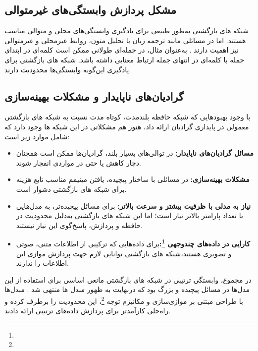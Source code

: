 \subsection{مشکل پردازش وابستگی‌های غیرمتوالی}
شبکه های بازگشتی به‌طور طبیعی برای یادگیری وابستگی‌های محلی و متوالی مناسب هستند. اما در مسائلی مانند ترجمه زبان یا تحلیل متون، روابط غیرمحلی و غیرمتوالی نیز اهمیت دارند
\cite{bahdanau2014neural}.
به‌عنوان مثال، در جمله‌ای طولانی ممکن است کلمه‌ای در ابتدای جمله با کلمه‌ای در انتهای جمله ارتباط معنایی داشته باشد. شبکه های بازگشتی برای یادگیری این‌گونه وابستگی‌ها محدودیت دارند.

\subsection{گرادیان‌های ناپایدار و مشکلات بهینه‌سازی}
با وجود بهبودهایی که شبکه حافظه بلندمدت، کوتاه مدت نسبت به شبکه های بازگشتی معمولی در پایداری گرادیان ارائه داد، هنوز هم مشکلاتی در این شبکه ها وجود دارد که شامل موارد زیر است:
\begin{itemize}
	\item \textbf{مسائل گرادیان‌های ناپایدار:}  
	در توالی‌های بسیار بلند، گرادیان‌ها ممکن است همچنان دچار کاهش یا حتی در مواردی انفجار شوند.
	
	\item \textbf{مشکلات بهینه‌سازی:}  
	در مسائلی با ساختار پیچیده، یافتن مینیمم مناسب تابع هزینه برای شبکه های بازگشتی دشوار است.
\end{itemize}


\begin{itemize}
	\item \textbf{نیاز به مدلی با ظرفیت بیشتر و سرعت بالاتر:}  
	برای مسائل پیچیده‌تر، به مدل‌هایی با تعداد پارامتر بالاتر نیاز است؛ اما این شبکه های بازگشتی به‌دلیل محدودیت در حافظه و پردازش، پاسخ‌گوی این نیاز نیستند.
	
\item \textbf{کارایی در داده‌های چندوجهی \footnote{}:}برای داده‌هایی که ترکیبی از اطلاعات متنی، صوتی و تصویری هستند،شبکه های بازگشتی توانایی لازم جهت پردازش موازی این اطلاعات را ندارند.
\end{itemize}

در مجموع، وابستگی ترتیبی در شبکه های بازگشتی مانعی اساسی برای استفاده از این مدل‌ها در مسائل پیچیده و بزرگ بود که درنهایت به ظهور مبدل ها منتهی شد
\cite{vaswani2017attention}.
مبدل‌ها با طراحی مبتنی بر موازی‌سازی و مکانیزم توجه \footnote{}، این محدودیت را برطرف کرده و راه‌حلی کارآمدتر برای پردازش داده‌های ترتیبی ارائه دادند.




